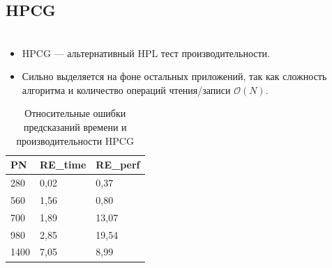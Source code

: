\documentclass[unicode, t, 11pt]{beamer}%
\newlength{\mylen}
\begin{document}
					

	 		
		\subsection{HPCG}
			\begin{frame}
				\footnotesize
				\frametitle{\insertsection}
		 		\framesubtitle{\insertsubsection}
		 		\begin{columns}[T]
		 			\setlength{\mylen}{0.45\textwidth}
		 			\begin{column}{\mylen}
		 				\begin{itemize}[label = \(\bullet\)]
					 		\item HPCG — альтернативный HPL тест производительности.
					 		\item Сильно выделяется на фоне остальных приложений, так как сложность алгоритма и количество операций чтения/записи \(\mathcal{O}(N)\).
					 	\end{itemize}
					 	\begin{table}
				 			\captionsetup{font=tiny, labelfont=tiny}
				 			\tiny
								\begin{tabularx}{\textwidth}{|X|X|X|}
									\hline
									PN   & RE\_time & RE\_perf \\ \hline
									280	 & 0,02     & 0,37     \\ \hline
									560	 & 1,56     & 0,80     \\ \hline
									700	 & 1,89     & 13,07    \\ \hline
									980	 & 2,85     & 19,54    \\ \hline
									1400 & 7,05     & 8,99     \\ \hline
								\end{tabularx}
							\caption{Относительные ошибки предсказаний времени и производительности HPCG}
						\end{table}
					 			

\end{column}
\end{columns}
\end{frame}
\end{document}
